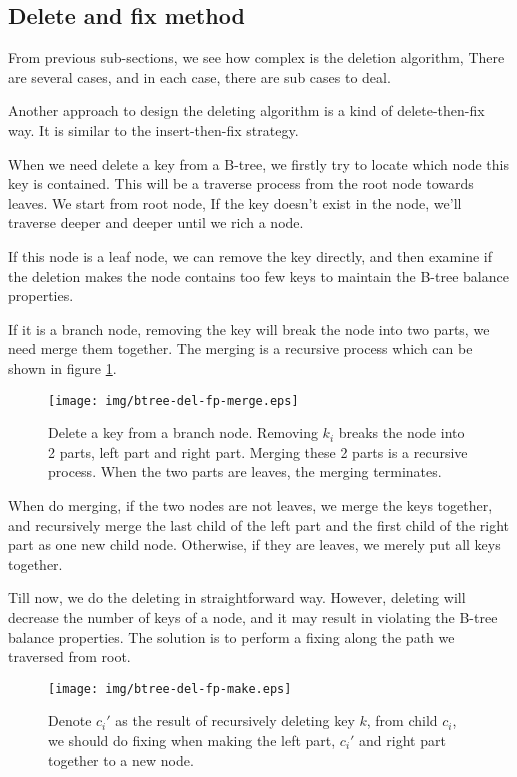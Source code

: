 \documentclass{article}
\begin{document}
\subsection{Delete and fix method}

From previous sub-sections, we see how complex is the deletion algorithm,
There are several cases, and in each case, there are sub cases to deal.

Another approach to design the deleting algorithm is a kind of delete-then-fix
way. It is similar to the insert-then-fix strategy.

When we need delete a key from a B-tree, we firstly try to locate
which node this key is contained. This will be a traverse process
from the root node towards leaves. We start from root node, If the
key doesn't exist in the node, we'll traverse deeper and deeper
until we rich a node.

If this node is a leaf node, we can remove the key directly, and then
examine if the deletion makes the node contains too few keys to
maintain the B-tree balance properties.

If it is a branch node, removing the key will break the node into
two parts, we need merge them together. The merging is a recursive
process which can be shown in figure \ref{fig:del-fp-merge}.

\begin{figure}[htbp]
    \begin{center}
      \texttt{[image: img/btree-del-fp-merge.eps]}
      \caption{Delete a key from a branch node. Removing $k_i$ breaks
the node into 2 parts, left part and right part. Merging these 2 parts
is a recursive process. When the two parts are leaves, the merging
terminates.} \label{fig:del-fp-merge}
    \end{center}
\end{figure}

When do merging, if the two nodes are not leaves, we merge the keys
together, and recursively merge the last child of the left part
and the first child of the right part as one new child node. Otherwise,
if they are leaves, we merely put all keys together.

Till now, we do the deleting in straightforward way. However, deleting
will decrease the number of keys of a node, and it may result in
violating the B-tree balance properties. The solution is to perform a
fixing along the path we traversed from root.

\begin{figure}[htbp]
    \begin{center}
      \texttt{[image: img/btree-del-fp-make.eps]}
      \caption{Denote $c_i'$ as the result of recursively deleting
key $k$, from child $c_i$, we should do fixing when making the
left part, $c_i'$ and right part together to a new node.} \label{fig:del-fp-make}
    \end{center}
\end{figure}
\end{document}

